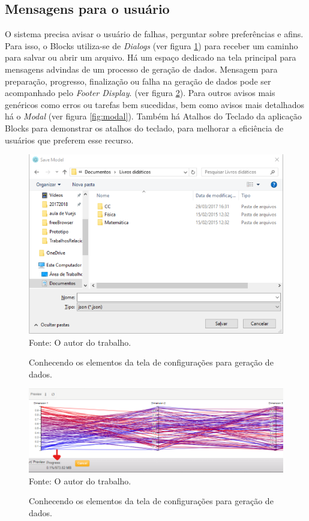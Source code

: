 \documentclass[
	12pt,				%
	openright,			%
	oneside,			%
	a4paper,			%
	english,			%
	brazil				%
	]{abntex2}
\begin{document}
		\subsection{Mensagens para o usuário}
			O sistema precisa avisar o usuário de falhas, perguntar sobre preferências e afins.
			Para isso, o Blocks utiliza-se de \emph{Dialogs} (ver figura \ref{fig:dialog}) para receber um caminho para salvar ou abrir um arquivo.
			Há um espaço dedicado na tela principal para mensagens advindas de um processo de geração de dados.
			Mensagem para preparação, progresso, finalização ou falha na geração de dados pode ser acompanhado pelo \emph{Footer Display}. (ver figura \ref{fig:SDvisor}).
			Para outros avisos mais genéricos como erros ou tarefas bem sucedidas, bem como avisos mais detalhados há o \emph{Modal} (ver figura \ref{fig:modal}).
			Também há Atalhos do Teclado da aplicação Blocks para demonstrar os atalhos do teclado, para melhorar a eficiência de usuários que preferem esse recurso.
			\begin{figure}[h]
				\centering
				\caption{Conhecendo os elementos da tela de configurações para geração de dados.}
				\includegraphics[width=\linewidth]{./figures/prototipo/dialog.png}
				\label{fig:dialog}
				\footnotesize Fonte: O autor do trabalho.
			\end{figure}
			\begin{figure}[h]
				\centering
				\caption{Conhecendo os elementos da tela de configurações para geração de dados.}
				\includegraphics[width=\linewidth]{./figures/prototipo/SDvisor.png}
				\label{fig:SDvisor}
				\footnotesize Fonte: O autor do trabalho.
			\end{figure}
\end{document}
